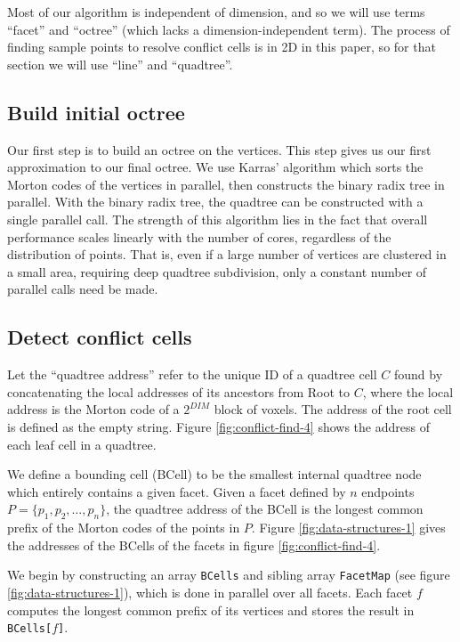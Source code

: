 \documentclass[submission]{gmp2017}
\begin{document}
Most of our algorithm is independent of dimension, and so we will use terms ``facet'' and ``octree'' (which lacks a dimension-independent term). The process of finding sample points to resolve conflict cells is in 2D in this paper, so for that section we will use ``line'' and ``quadtree''.

\subsection{Build initial octree}
\label{sec:build-initial-octree}
Our first step is to build an octree on the vertices. This step gives us our first approximation to our final octree. We use Karras' algorithm \cite{karras2012maximizing} which sorts the Morton codes of the vertices in parallel, then constructs the binary radix tree in parallel. With the binary radix tree, the quadtree can be constructed with a single parallel call. The strength of this algorithm lies in the fact that overall performance scales linearly with the number of cores, regardless of the distribution of points. That is, even if a large number of vertices are clustered in a small area, requiring deep quadtree subdivision, only a constant number of parallel calls need be made.

\subsection{Detect conflict cells}

Let the ``quadtree address'' refer to the unique ID of a quadtree cell $C$ found by concatenating the local addresses of its ancestors from Root to $C$, where the local address is the Morton code of a $2^{DIM}$ block of voxels. The address of the root cell is defined as the empty string. Figure \ref{fig:conflict-find-4} shows the address of each leaf cell in a quadtree.

We define a bounding cell (BCell) to be the smallest internal quadtree node which entirely contains a given facet. Given a facet defined by $n$ endpoints $P=\{p_1, p_2, \dots, p_n\}$, the quadtree address of the BCell is the longest common prefix of the Morton codes of the points in $P$. Figure \ref{fig:data-structures-1} gives the addresses of the BCells of the facets in figure \ref{fig:conflict-find-4}.

We begin by constructing an array \texttt{BCells} and sibling array \texttt{FacetMap} (see figure \ref{fig:data-structures-1}), which is done in parallel over all facets. Each facet $f$ computes the longest common prefix of its vertices and stores the result in \texttt{BCells[$f$]}.
\end{document}
